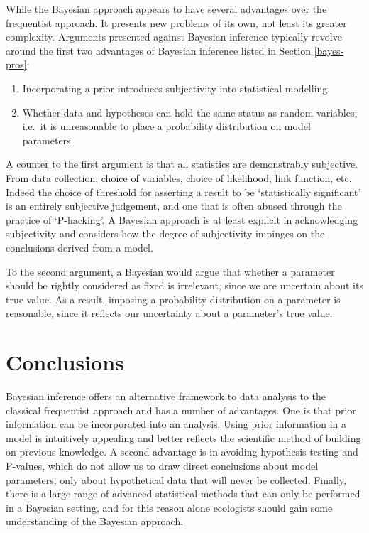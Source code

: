 \documentclass[
]{book}
\begin{document}
While the Bayesian approach appears to have several advantages over the frequentist approach. It presents new problems of its own, not least its greater complexity. Arguments presented against Bayesian inference typically revolve around the first two advantages of Bayesian inference listed in Section \ref{bayes-pros}:

\begin{enumerate}
\def\labelenumi{\arabic{enumi}.}
\item
  Incorporating a prior introduces subjectivity into statistical modelling.
\item
  Whether data and hypotheses can hold the same status as random variables; i.e.~it is unreasonable to place a probability distribution on model parameters.
\end{enumerate}

A counter to the first argument is that all statistics are demonstrably subjective. From data collection, choice of variables, choice of likelihood, link function, etc. Indeed the choice of threshold for asserting a result to be `statistically significant' is an entirely subjective judgement, and one that is often abused through the practice of `P-hacking'. A Bayesian approach is at least explicit in acknowledging subjectivity and considers how the degree of subjectivity impinges on the conclusions derived from a model.

To the second argument, a Bayesian would argue that whether a parameter should be rightly considered as fixed is irrelevant, since we are uncertain about its true value. As a result, imposing a probability distribution on a parameter is reasonable, since it reflects our uncertainty about a parameter's true value.

\hypertarget{bayes-concl}{%
\section{Conclusions}\label{bayes-concl}}

Bayesian inference offers an alternative framework to data analysis to the classical frequentist approach and has a number of advantages. One is that prior information can be incorporated into an analysis. Using prior information in a model is intuitively appealing and better reflects the scientific method of building on previous knowledge. A second advantage is in avoiding hypothesis testing and P-values, which do not allow us to draw direct conclusions about model parameters; only about hypothetical data that will never be collected. Finally, there is a large range of advanced statistical methods that can only be performed in a Bayesian setting, and for this reason alone ecologists should gain some understanding of the Bayesian approach.
\end{document}
